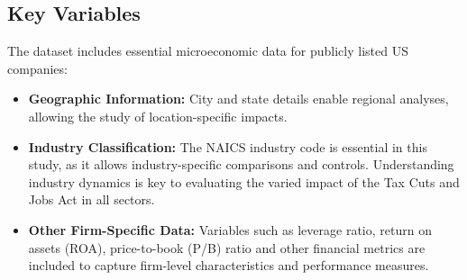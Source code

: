 \documentclass[11pt]{article}
\begin{document}
\subsection{Key Variables}
The dataset includes essential microeconomic data for publicly listed US companies:

\begin{itemize}
    \item \textbf{Geographic Information:} City and state details enable regional analyses, allowing the study of location-specific impacts.
    \item \textbf{Industry Classification:} The NAICS industry code is essential in this study, as it allows industry-specific comparisons and controls. Understanding industry dynamics is key to evaluating the varied impact of the Tax Cuts and Jobs Act in all sectors.
    \item \textbf{Other Firm-Specific Data:} Variables such as leverage ratio, return on assets (ROA), price-to-book (P/B) ratio and other financial metrics are included to capture firm-level characteristics and performance measures.
\end{itemize}
\end{document}
